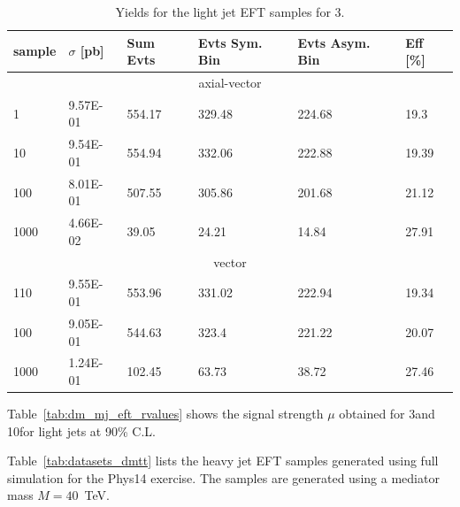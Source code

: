 \begin{table}[h!]
\centering
\begin{tabular}{llllll}
\hline
sample             & $\sigma$ [pb] & Sum Evts       & Evts Sym. Bin & Evts Asym. Bin & Eff  [\%]   \\\hline
\multicolumn{6}{c}{axial-vector}        \\ \hline
1    & 9.57E-01 & 554.17 & 329.48 & 224.68 & 19.3  \\
10   & 9.54E-01 & 554.94 & 332.06 & 222.88 & 19.39 \\
100  & 8.01E-01 & 507.55 & 305.86 & 201.68 & 21.12 \\
1000 & 4.66E-02 & 39.05  & 24.21  & 14.84  & 27.91 \\
\multicolumn{6}{c}{vector}        \\ \hline
110    & 9.55E-01 & 553.96 & 331.02 & 222.94 & 19.34 \\
100   & 9.05E-01 & 544.63 & 323.4  & 221.22 & 20.07 \\
1000  & 1.24E-01 & 102.45 & 63.73  & 38.72  & 27.46 \\
\hline
\end{tabular}
\caption{Yields for the light jet EFT samples for 3\fbinv.} 
\label{tab:dm_mj_eft_yields}
\end{table}



Table~\ref{tab:dm_mj_eft_rvalues} shows the signal strength $\mu$ obtained for 3\fbinv and 10\fbinv for light jets at 90\% C.L. %



Table~\ref{tab:datasets_dmtt} lists the heavy jet EFT samples generated using full simulation for the Phys14 exercise. The samples are generated using a mediator mass $M=40$~TeV.

